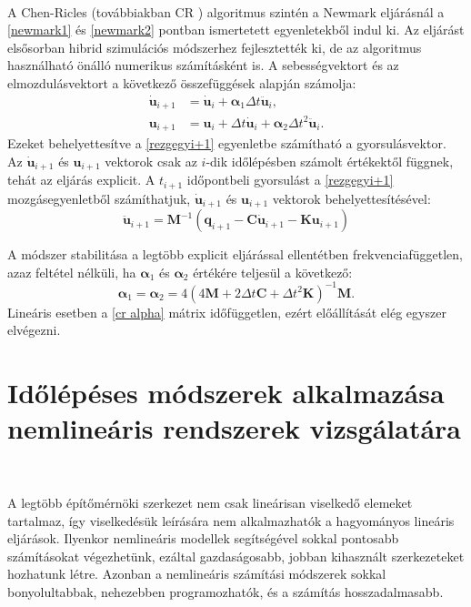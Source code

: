 {\ }

A Chen-Ricles (továbbiakban CR \cite{crcontthe}) algoritmus szintén a Newmark eljárásnál a \eqref{newmark1} és \eqref{newmark2} pontban ismertetett egyenletekből indul ki. Az eljárást elsősorban hibrid szimulációs módszerhez fejlesztették ki, de az algoritmus használható önálló numerikus számításként is. A sebességvektort és az elmozdulásvektort a következő összefüggések alapján számolja:  
\begin{subequations}
\begin{align}
\mathbf{\dot{u}}_{i+1} & = \mathbf{\dot{u}}_i+\boldsymbol\alpha_1\Delta{t}\mathbf{\ddot{u}}_i, \\
\mathbf{u}_{i+1} & = \mathbf{u}_i+\Delta{t}\mathbf{\dot{u}}_{i}+\boldsymbol\alpha_2\Delta{t}^2\mathbf{\ddot{u}}_i.
\end{align}
\end{subequations}
 Ezeket behelyettesítve a \eqref{rezgegyi+1} egyenletbe számítható a gyorsulásvektor. Az $\mathbf{\dot{u}}_{i+1}$ és $\mathbf{u}_{i+1}$ vektorok csak az $i$-dik időlépésben számolt értékektől függnek, tehát az eljárás explicit. A $t_{i+1}$ időpontbeli gyorsulást a \eqref{rezgegyi+1}  mozgásegyenletből számíthatjuk, $\mathbf{\dot{u}}_{i+1}$ és $\mathbf{u}_{i+1}$ vektorok behelyettesítésével:
\begin{equation}
\mathbf{\ddot{u}}_{i+1} = \mathbf{M}^{-1}(\mathbf{q}_{i+1}-\mathbf{C}\mathbf{\dot{u}}_{i+1}-\mathbf{K}\mathbf{u}_{i+1})
\end{equation} 
  
A módszer stabilitása a legtöbb explicit eljárással ellentétben frekvenciafüggetlen, azaz feltétel nélküli, ha  $\boldsymbol\alpha_1$ és  $\boldsymbol\alpha_2$ értékére teljesül a következő:
\begin{equation}
\label{cr alpha}
\boldsymbol\alpha_1 = \boldsymbol\alpha_2 = 4(4\mathbf{M}+2\Delta{t}\mathbf{C}+\Delta{t}^2\mathbf{K})^{-1}\mathbf{M}.
\end{equation}
Lineáris esetben a \eqref{cr alpha} mátrix időfüggetlen, ezért  előállítását elég egyszer elvégezni.


\section {Időlépéses módszerek alkalmazása nemlineáris rendszerek vizsgálatára}\label{sec:nl idolepmsz}

{\ }

A legtöbb építőmérnöki szerkezet nem csak lineárisan viselkedő elemeket tartalmaz, így viselkedésük leírására nem alkalmazhatók a hagyományos lineáris eljárások. Ilyenkor nemlineáris modellek segítségével sokkal pontosabb számításokat végezhetünk, ezáltal gazdaságosabb, jobban kihasznált szerkezeteket hozhatunk létre. Azonban a nemlineáris számítási módszerek sokkal bonyolultabbak, nehezebben programozhatók, és  a számítás hosszadalmasabb. 

